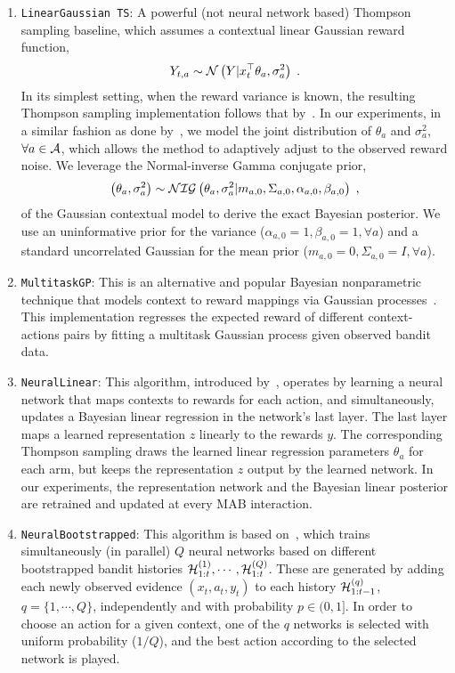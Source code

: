 \begin{enumerate}
	\item \texttt{LinearGaussian TS}: A powerful (not neural network based) Thompson sampling baseline, which assumes a contextual linear Gaussian reward function,
	\begin{equation}
	Y_{t,a}\sim \mathcal{N}\left( Y|x_t^\top\theta_a, \sigma_a^2\right) \;. \nonumber
	\end{equation}
	In its simplest setting, when the reward variance is known, the resulting Thompson sampling implementation follows that by~\citet{ip-Agrawal2013a}. In our experiments, in a similar fashion as done by~\citet{ip-Riquelme2018}, we model the joint distribution of $\theta_a$ and $\sigma_a^2$, $\forall a \in \mathcal{A}$, which allows the method to adaptively adjust to the observed reward noise. We leverage the Normal-inverse Gamma conjugate prior, \ie
	\begin{equation}
	\left(\theta_a, \sigma_a^2\right) \sim \mathcal{NIG}\left( \theta_a, \sigma_a^2 |m_{a,0}, \Sigma_{a,0},\alpha_{a,0}, \beta_{a,0}\right) \; ,
	\end{equation}
	of the Gaussian contextual model to derive the exact Bayesian posterior. We use an uninformative prior for the variance ($\alpha_{a,0}=1, \beta_{a,0}=1, \forall a$) and a standard uncorrelated Gaussian for the mean prior ($m_{a,0}=0, \Sigma_{a,0}=I, \forall a$).

	\item \texttt{MultitaskGP}: This is an alternative and popular Bayesian nonparametric technique that models context to reward mappings via Gaussian processes~\citep{ip-Srinivas2010,ip-Gruenewaelder2010,ic-Krause2011}. This implementation regresses the expected reward of different context-actions pairs by fitting a multitask Gaussian process given observed bandit data.
	
	\item \texttt{NeuralLinear}: This algorithm, introduced by~\citet{ip-Riquelme2018}, operates by learning a neural network that maps contexts to rewards for each action, and simultaneously, updates a Bayesian linear regression in the network's last layer. The last layer maps a learned representation $z$ linearly to the rewards $y$. The corresponding Thompson sampling draws the learned linear regression parameters $\theta_a$ for each arm, but keeps the representation $z$ output by the learned network. In our experiments, the representation network and the Bayesian linear posterior are retrained and updated at every MAB interaction.

	\item \texttt{NeuralBootstrapped}: This algorithm is based on~\citep{ic-Osband2016}, which trains simultaneously (in parallel) $Q$ neural networks based on different bootstrapped bandit histories $\mathcal{H}_{1:t}^{(1)},\cdots, \mathcal{H}_{1:t}^{(Q)}$. These are generated by adding each newly observed evidence $(x_{t}, a_{t}, y_{t})$ to each history $\mathcal{H}_{1:t-1}^{(q)}$, $q=\{1, \cdots,Q\}$, independently and with probability $p \in (0, 1]$. In order to choose an action for a given context, one of the $q$ networks is selected with uniform probability ($1/Q$), and the best action according to the selected network is played.
	

\end{enumerate}
